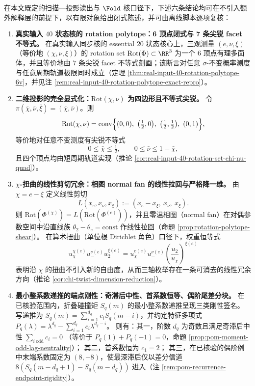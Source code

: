 \begin{theorem}\label{thm:tri-interface-discrete-convex-arithmetic}
在本文既定的扫描—投影读出与 \(\Fold\) 核口径下，下述六条结论均可在不引入额外解释层的前提下，以有限对象给出闭式陈述，并可由离线脚本逐项复核：
\begin{enumerate}
  \item \textbf{真实输入 \(40\) 状态核的 rotation polytope：6 顶点闭式与 7 条尖锐 facet 不等式。}
  在真实输入同步核的 essential \(20\) 状态核心上，三观测量 \((e,\nu,\xi)\)（等价地 \((\chi,\nu,\xi)\)）的 rotation set \(\mathrm{Rot}(\Phi)\subset\RR^3\) 为一个 \(6\) 顶点有理多面体，并且等价地由 \(7\) 条尖锐 facet 不等式刻画；该断言对任意 \(\sigma\)-不变概率测度与任意周期轨道极限同时成立（定理 \ref{thm:real-input-40-rotation-polytope-6v}，并见注 \ref{rem:real-input-40-rotation-polytope-exact-repro}）。

  \item \textbf{二维投影的完全显式化：\(\mathrm{Rot}(\chi,\nu)\) 为四边形且不等式尖锐。}
  令 \(\pi(\bar\chi,\bar\nu,\bar\xi)=(\bar\chi,\bar\nu)\)。则
  \[
  \mathrm{Rot}(\chi,\nu)
  =\mathrm{conv}\Bigl\{(0,0),\ \bigl(\tfrac12,0\bigr),\ \bigl(\tfrac12,\tfrac12\bigr),\ (0,1)\Bigr\},
  \]
  等价地对任意不变测度有尖锐不等式
  \[
  0\le \bar\chi\le\tfrac12,
  \qquad
  0\le \bar\nu\le 1-\bar\chi,
  \]
  且四个顶点均由短周期轨道实现（推论 \ref{cor:real-input-40-rotation-set-chi-nu-quad}）。

  \item \textbf{\(\chi\)-扭曲的线性剪切冗余：相图 normal fan 的线性拉回与严格降一维。}
  由 \(\chi=e-\xi\) 定义线性剪切
  \[
  L(x_e,x_\nu,x_\xi):=(x_e-x_\xi,\ x_\nu,\ x_\xi).
  \]
  则
  \(
  \mathrm{Rot}(\Phi^{(\chi)})=L(\mathrm{Rot}(\Phi^{(e)}))
  \)，并且零温相图（normal fan）在对偶参数空间中沿直线族 \(\theta_2-\theta_e=\mathrm{const}\) 作线性拉回（命题 \ref{prop:rotation-polytope-shear}）。
  在算术扭曲（单位根 Dirichlet 角色）口径下，权重恒等式
  \[
  u_\chi^{\chi(e)}u_-^{\nu(e)}u_2^{\xi(e)}
  =u_\chi^{e(e)}u_-^{\nu(e)}\left(\frac{u_2}{u_\chi}\right)^{\xi(e)}
  \]
  表明沿 \(\chi\) 的扭曲不引入新的自由度，从而三轴枚举存在一条可消去的线性冗余方向（推论 \ref{cor:chi-twist-dimension-reduction}）。

  \item \textbf{最小整系数递推的端点刚性：奇滞后中性、首系数恒等、偶阶尾差分块。}
  在已核验范围内，折叠碰撞矩 \(S_q(m)\) 的最小整系数递推呈现三类刚性签名。
  写递推为 \(S_q(m)=\sum_{i=1}^{d_q}c_iS_q(m-i)\)，并约定特征多项式 \(P_q(\lambda)=\lambda^{d_q}-\sum_{i=1}^{d_q}c_i\lambda^{d_q-i}\)。
  则有：其一，阶数 \(d_q\) 为奇数且满足奇滞后中性
  \(
  \sum_{i\ \mathrm{odd}}c_i=0
  \)
  （等价于 \(P_q(1)+P_q(-1)=0\)，命题 \ref{prop:pom-moment-odd-lag-neutrality}）；
  其二，首系数恒为 \(c_1=2\)；
  其三，在已核验的偶阶例中末端系数固定为 \((8,-8)\)，使最深滞后仅以差分信道 \(8(S_q(m-d_q+1)-S_q(m-d_q))\) 进入（注 \ref{rem:pom-recurrence-endpoint-rigidity}）。


\end{enumerate}
\end{theorem}
